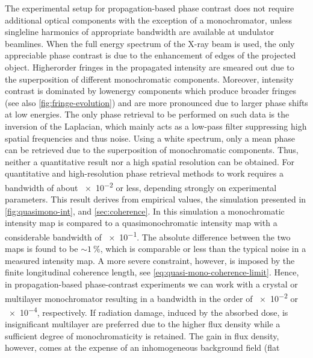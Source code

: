 \documentclass[
twoside,
openright,
titlepage,
numbers=noenddot,
headinclude,
fleqn,
a4paper,
footinclude=true,
cleardoublepage=empty,
abstractoff,
BCOR=5mm,
paper=a4,
fontsize=11pt,
british,ngerman,american,
]{scrreprt}
\begin{document}
The experimental setup for propagation-based phase contrast does not
require additional optical components with the exception of a
monochromator, unless single\hyph line harmonics of appropriate
bandwidth are available at undulator beamlines.
When the full energy spectrum of the X-ray beam is used, the only
appreciable phase contrast is due to the enhancement of edges of the
projected object.  Higher\hyph order fringes in the propagated
intensity are smeared out due to the superposition of different
monochromatic components.  Moreover, intensity contrast is dominated
by low\hyph energy components which produce broader fringes (see also
\cref{fig:fringe-evolution}) and are more pronounced due to larger
phase shifts at low energies.  The only phase retrieval to be
performed on such data is the inversion of the Laplacian, which mainly
acts as a low-pass filter suppressing high spatial frequencies and
thus noise.  Using a white spectrum, only a mean phase can be
retrieved due to the superposition of monochromatic components.  Thus,
neither a quantitative result nor a high spatial resolution can be
obtained.  For quantitative and high-resolution phase retrieval
methods to work requires a bandwidth of about \num{e-2} or less,
depending strongly on experimental parameters. This result derives
from empirical values, the simulation presented in
\cref{fig:quasimono-int}, and \cref{sec:coherence}.  In this
simulation a monochromatic intensity map is compared to a
quasimonochromatic intensity map with a considerable bandwidth of
\num{e-1}.  The absolute difference between the two maps is found to
be $\sim\SI{1}{\percent}$, which is comparable or less than the
typical noise in a measured intensity map.  A more severe constraint,
however, is imposed by the finite longitudinal coherence length, see
\cref{eq:quasi-mono-coherence-limit}.
Hence, in  propagation-based phase-contrast experiments we can work
with a crystal or multilayer monochromator resulting in a bandwidth in
the order of \num{e-2} or \num{e-4}, respectively.  If radiation
damage, induced by the absorbed dose, is insignificant multilayer are
preferred due to the higher flux density while a sufficient degree of
monochromaticity is retained.  The gain in flux density, however,
comes at the expense of an inhomogeneous background field (flat
\end{document}
